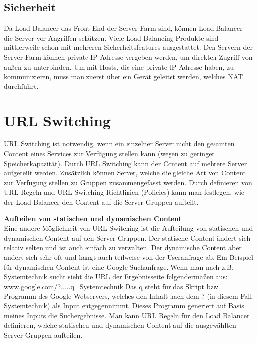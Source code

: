 \subsection{Sicherheit}
\label{sec:Sicherheit}

Da Load Balancer das Front End der Server Farm sind, können Load Balancer die Server vor Angriffen schützen. Viele Load Balancing Produkte sind mittlerweile schon mit mehreren Sicherheitsfeatures ausgestattet. Den Servern der Server Farm können private IP Adresse vergeben werden, um direkten Zugriff von außen zu unterbinden. Um mit Hosts, die eine private IP Adresse haben, zu kommunizieren, muss man zuerst über ein Gerät geleitet werden, welches NAT durchführt. \cite{LoadBalancing2}    
\pagebreak

\section{URL Switching}
\label{sec:URL Switching}

URL Switching ist notwendig, wenn ein einzelner Server nicht den gesamten Content eines Services zur Verfügung stellen kann (wegen zu geringer Speicherkapazität). Durch URL  Switching kann der Content auf mehrere Server aufgeteilt werden. Zusätzlich können Server, welche die gleiche Art von Content zur Verfügung stellen zu Gruppen zusammengefasst werden. Durch definieren von URL Regeln und URL Switching Richtlinien (Policies) kann man festlegen, wie der Load Balancer den Content auf die Server Gruppen aufteilt.\vspace{5mm}

\textbf{Aufteilen von statischen und dynamischen Content} \\

Eine andere Möglichkeit von URL Switching ist die Aufteilung von statischen und dynamischen Content auf den Server Gruppen. Der statische Content ändert sich relativ selten und ist auch einfach zu verwalten. Der dynamische Content aber ändert sich sehr oft und hängt auch teilweise von der Useranfrage ab. 
Ein Beispiel für dynamischen Content ist eine Google Suchanfrage. Wenn man nach z.B. Systemtechnik sucht sieht die URL der Ergebnisseite folgendermaßen aus: 
www.google.com/?.....q=Systemtechnik
Das q steht für das Skript bzw. Programm des Google Webservers, welches den Inhalt nach dem ? (in diesem Fall Systemtechnik) als Input entgegennimmt. Dieses Programm generiert auf Basis meines Inputs die Suchergebnisse.
Man kann URL Regeln für den Load Balancer definieren, welche statischen und dynamischen Content auf die ausgewählten Server Gruppen aufteilen.\vspace{5mm}


